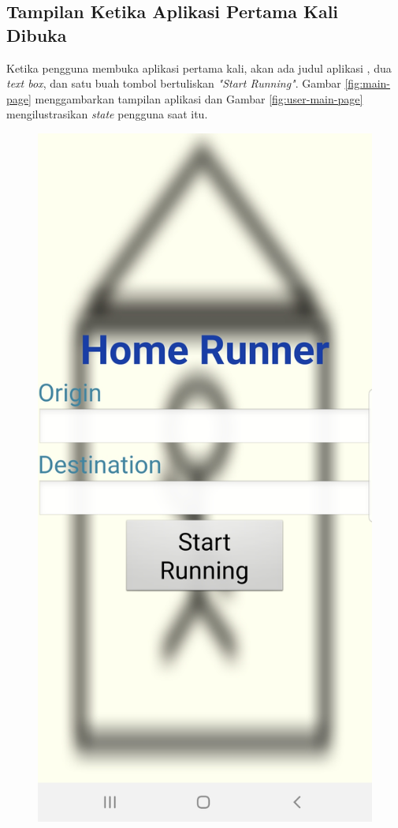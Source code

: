 \subsection{Tampilan Ketika Aplikasi Pertama Kali Dibuka}
Ketika pengguna membuka aplikasi pertama kali, akan ada judul aplikasi , dua \textit{text box}, dan satu buah tombol bertuliskan \textit{"Start Running"}. Gambar \ref{fig:main-page} menggambarkan tampilan aplikasi dan Gambar \ref{fig:user-main-page} mengilustrasikan \textit{state} pengguna saat itu.

\begin{figure}
  \includegraphics[scale=0.15]{Gambar/main-page.png}

\end{figure}
